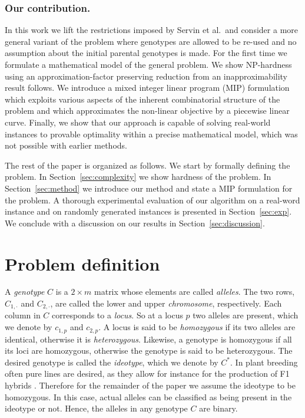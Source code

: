 \documentclass[runningheads]{llncs}
\newcommand{\obacht}[2][nobody]{\marginpar{\raggedright \tiny \textbf{obacht:} #2 (#1)}}
\begin{document}
\subsubsection{Our contribution.}

In this work we lift the restrictions imposed by Servin et al.\ and consider a more general variant of the problem where genotypes are allowed to be re-used and no assumption about the initial parental genotypes is made. For the first time we formulate a mathematical model of the general problem. We show NP-hardness using an approximation-factor preserving reduction from an inapproximability result follows. We introduce a mixed integer linear program (MIP) formulation which exploits various aspects of the inherent combinatorial structure of the problem and
which approximates the non-linear objective by a piecewise linear curve.
Finally, we show that our approach is capable of solving real-world instances to provable optimality within a precise mathematical model, which was not possible
with earlier methods.


The rest of the paper is organized as follows. We start by formally defining the problem. In Section~\ref{sec:complexity} we show hardness of the problem.
In Section~\ref{sec:method} we introduce our method and state a MIP formulation for the problem. A thorough experimental evaluation
of our algorithm on a real-word instance and on randomly generated instances is presented in Section~\ref{sec:exp}. We conclude with a discussion on our results in Section~\ref{sec:discussion}.


\section{Problem definition}

A \emph{genotype} $C$ is a $2 \times m$ matrix whose elements are called \emph{alleles}. The two rows, $C_{1,\cdot}$ and $C_{2,\cdot}$, are called the lower and upper \emph{chromosome}, respectively. Each column in $C$ corresponds to a \emph{locus}. So at a locus $p$ two alleles are present, which we denote by $c_{1,p}$ and $c_{2,p}$. A locus is said to be \emph{homozygous} if its two alleles are identical, otherwise it is \emph{heterozygous}. Likewise, a genotype is homozygous if all its loci are homozygous, otherwise the genotype is said to be heterozygous. The desired genotype is called the \emph{ideotype}, which we denote by $C^*$. In plant breeding often pure lines are desired, as they allow for instance for the production of F1 hybrids \cite{BC:2008}. Therefore for the remainder of the paper we assume the ideotype to be homozygous. In this case, actual alleles can be classified as being present in the ideotype or not. Hence, the alleles in any genotype $C$ are binary.
\end{document}
